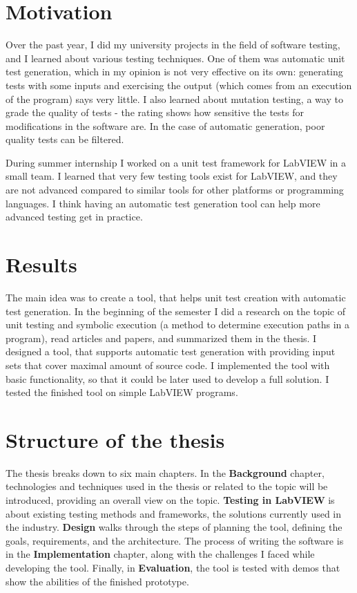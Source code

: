 \section{Motivation}
Over the past year, I did my university projects in the field of software testing, and I learned about various testing techniques. One of them was automatic unit test generation, which in my opinion is not very effective on its own: generating tests with some inputs and exercising the output (which comes from an execution of the program) says very little. I also learned about mutation testing, a way to grade the quality of tests - the rating shows how sensitive the tests for modifications in the software are. In the case of automatic generation, poor quality tests can be filtered.

During summer internship I worked on a unit test framework for LabVIEW in a small team. I learned that very few testing tools exist for LabVIEW, and they are not advanced compared to similar tools for other platforms or programming languages. I think having an automatic test generation tool can help more advanced testing get in practice.


\section{Results}
The main idea was to create a tool, that helps unit test creation with automatic test generation. In the beginning of the semester I did a research on the topic of unit testing and symbolic execution (a method to determine execution paths in a program), read articles and papers, and summarized them in the thesis. I designed a tool, that supports automatic test generation with providing input sets that cover maximal amount of source code. I implemented the tool with basic functionality, so that it could be later used to develop a full solution. I tested the finished tool on simple LabVIEW programs.
\section{Structure of the thesis}
The thesis breaks down to six main chapters. In the \textbf{Background} chapter, technologies and techniques used in the thesis or related to the topic will be introduced, providing an overall view on the topic. \textbf{Testing in LabVIEW} is about existing testing methods and frameworks, the solutions currently used in the industry. \textbf{Design} walks through the steps of planning the tool, defining the goals, requirements, and the architecture. The process of writing the software is in the \textbf{Implementation} chapter, along with the challenges I faced while developing the tool. Finally, in \textbf{Evaluation}, the tool is tested with demos that show the abilities of the finished prototype.
\pagebreak